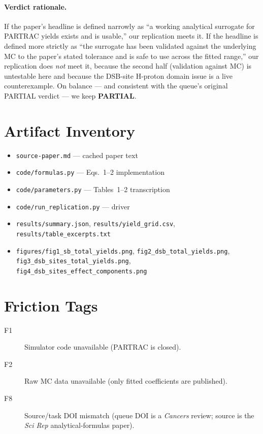 \documentclass[11pt]{article}
\begin{document}
\paragraph{Verdict rationale.} If the paper's headline is defined narrowly as ``a working analytical surrogate for PARTRAC yields exists and is usable,'' our replication meets it. If the headline is defined more strictly as ``the surrogate has been validated against the underlying MC to the paper's stated tolerance and is safe to use across the fitted range,'' our replication does \emph{not} meet it, because the second half (validation against MC) is untestable here and because the DSB-site H-proton domain issue is a live counterexample. On balance --- and consistent with the queue's original PARTIAL verdict --- we keep \textbf{PARTIAL}.

\section{Artifact Inventory}

\begin{itemize}
  \item \texttt{source-paper.md} --- cached paper text
  \item \texttt{code/formulas.py} --- Eqs.~1--2 implementation
  \item \texttt{code/parameters.py} --- Tables~1--2 transcription
  \item \texttt{code/run\_replication.py} --- driver
  \item \texttt{results/summary.json}, \texttt{results/yield\_grid.csv}, \texttt{results/table\_excerpts.txt}
  \item \texttt{figures/fig1\_sb\_total\_yields.png}, \texttt{fig2\_dsb\_total\_yields.png}, \texttt{fig3\_dsb\_sites\_total\_yields.png}, \texttt{fig4\_dsb\_sites\_effect\_components.png}
\end{itemize}

\section{Friction Tags}
\begin{description}
  \item[F1] Simulator code unavailable (PARTRAC is closed).
  \item[F2] Raw MC data unavailable (only fitted coefficients are published).
  \item[F8] Source/task DOI mismatch (queue DOI is a \emph{Cancers} review; source is the \emph{Sci Rep} analytical-formulas paper).
\end{description}


\end{document}
